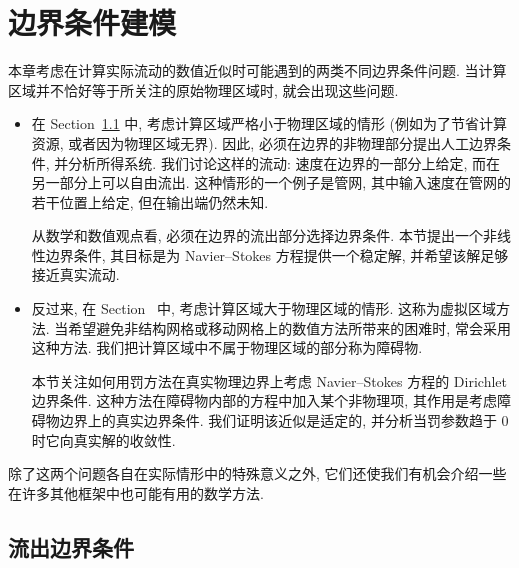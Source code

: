 \clearpage
\section{边界条件建模}
\label{chap:boundary-conditions-modelling}
\renewcommand{\thestatement}{1.\arabic{statement}}
\renewcommand{\theHstatement}{ch07.sec01.\arabic{statement}}
\setcounter{statement}{0}
\setcounter{figure}{0}
\renewcommand{\thefigure}{VII.\arabic{figure}}
\renewcommand{\thechaptersevensectiononeremark}{1.\arabic{chaptersevensectiononeremark}}
\begin{sloppypar}

本章考虑在计算实际流动的数值近似时可能遇到的两类不同边界条件问题. 当计算区域并不恰好等于所关注的原始物理区域时, 就会出现这些问题.

\begin{itemize}
 \item 在 Section~\ref{sec:chap7-outflow-boundary-conditions} 中, 考虑计算区域严格小于物理区域的情形 (例如为了节省计算资源, 或者因为物理区域无界). 因此, 必须在边界的非物理部分提出人工边界条件, 并分析所得系统. 我们讨论这样的流动: 速度在边界的一部分上给定, 而在另一部分上可以自由流出. 这种情形的一个例子是管网, 其中输入速度在管网的若干位置上给定, 但在输出端仍然未知.

 从数学和数值观点看, 必须在边界的流出部分选择边界条件. 本节提出一个非线性边界条件, 其目标是为 Navier--Stokes 方程提供一个稳定解, 并希望该解足够接近真实流动.
 \item 反过来, 在 Section~ 中, 考虑计算区域大于物理区域的情形. 这称为虚拟区域方法. 当希望避免非结构网格或移动网格上的数值方法所带来的困难时, 常会采用这种方法. 我们把计算区域中不属于物理区域的部分称为障碍物.

 本节关注如何用罚方法在真实物理边界上考虑 Navier--Stokes 方程的 Dirichlet 边界条件. 这种方法在障碍物内部的方程中加入某个非物理项, 其作用是考虑障碍物边界上的真实边界条件. 我们证明该近似是适定的, 并分析当罚参数趋于 $0$ 时它向真实解的收敛性.
\end{itemize}

除了这两个问题各自在实际情形中的特殊意义之外, 它们还使我们有机会介绍一些在许多其他框架中也可能有用的数学方法.

\subsection{流出边界条件}
\label{sec:chap7-outflow-boundary-conditions}


\end{sloppypar}
